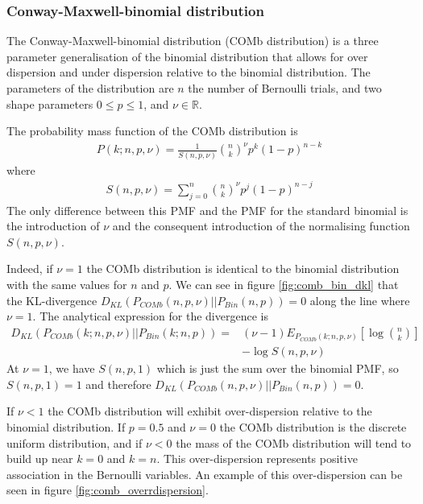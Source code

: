       \subsubsection{Conway-Maxwell-binomial distribution}\label{sec:conway_maxwell_binomial_distribution}
      The Conway-Maxwell-binomial distribution (COMb distribution) is a three parameter generalisation of the binomial distribution that allows for over dispersion and under dispersion relative to the binomial distribution. The parameters of the distribution are $n$ the number of Bernoulli trials, and two shape parameters $0 \leq p \leq 1$, and $\nu \in \mathbb{R}$.

      The probability mass function of the COMb distribution is
      \begin{align}\label{eq:comb_pmf}
        P(k;n,p,\nu) = \frac{1}{S(n,p,\nu)}\binom{n}{k}^{\nu} p^k (1-p)^{n-k}
      \end{align}
      where
      \begin{align}\label{eq:comb_norm}
        S(n,p,\nu) = \sum_{j=0}^n \binom{n}{k}^{\nu} p^j (1-p)^{n-j}
      \end{align}
      The only difference between this PMF and the PMF for the standard binomial is the introduction of $\nu$ and the consequent introduction of the normalising function $S(n,p,\nu)$.

      Indeed, if $\nu = 1$ the COMb distribution is identical to the binomial distribution with the same values for $n$ and $p$. We can see in figure \ref{fig:comb_bin_dkl} that the KL-divergence $D_{KL}(P_{COMb}(n,p,\nu) || P_{Bin}(n,p))=0$ along the line where $\nu=1$. The analytical expression for the divergence is
      \begin{align}
        D_{KL}(P_{COMb}(k;n,p,\nu) || P_{Bin}(k;n,p)) = &(\nu - 1) E_{P_{COMb}(k;n,p,\nu)}\left[ \log \binom{n}{k} \right] \\
          &- \log S(n,p,\nu)
      \end{align}
      At $\nu = 1$, we have $S(n,p,1)$ which is just the sum over the binomial PMF, so $S(n,p,1) = 1$ and therefore $D_{KL}(P_{COMb}(n,p,\nu) || P_{Bin}(n,p))=0$.

      If $\nu < 1$ the COMb distribution will exhibit over-dispersion relative to the binomial distribution. If $p=0.5$ and $\nu=0$ the COMb distribution is the discrete uniform distribution, and if $\nu < 0$ the mass of the COMb distribution will tend to build up near $k=0$ and $k=n$. This over-dispersion represents positive association in the Bernoulli variables. An example of this over-dispersion can be seen in figure \ref{fig:comb_overrdispersion}.

